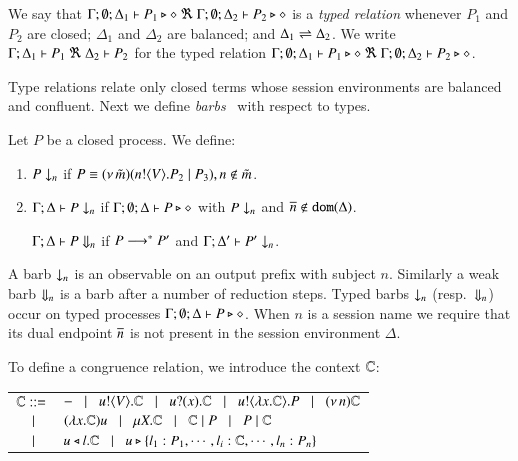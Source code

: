 \smallskip 

\begin{definition}\rm %
	We say that
	$\Gamma; \emptyset; \Delta_1 \vdash P_1 \triangleright \diamond\ \Re \ \Gamma; \emptyset; \Delta_2 \vdash P_2 \triangleright \diamond$
	is a {\em typed relation} whenever $P_1$ and $P_2$ are closed;
		$\Delta_1$ and $\Delta_2$ are balanced; and 
		$\Delta_1 \rightleftharpoons \Delta_2$.
We write
$\horel{\Gamma}{\Delta_1}{P_1}{\ \Re \ }{\Delta_2}{P_2}$
for the typed relation $\Gamma; \emptyset; \Delta_1 \vdash P_1 \triangleright \diamond\ \Re \ \Gamma; \emptyset; \Delta_2 \vdash P_2 \triangleright \diamond$.
\end{definition}

\smallskip 

\noi Type relations relate only closed terms whose
session environments %
are balanced  and confluent.
Next we define  {\em barbs}~\cite{MiSa92}
with respect to types. 

\smallskip 

\begin{definition}[Barbs]\rm
Let $P$ be a closed process. We define:
\begin{enumerate}
		\item	$P \downarrow_{n}$ if $P \equiv (\nu\, \tilde{m})(n ! \langle V \rangle . P_2 \;|\; P_3), n \notin \tilde{m}$. %

		\item	$\Gamma; \Delta \vdash P \downarrow_{n}$ if
			$\Gamma; \emptyset; \Delta \vdash P \triangleright \diamond$ with $P \downarrow_{n}$ and $\overline{n} \notin \mathtt{dom}(\Delta)$.

	$\Gamma; \Delta \vdash P \Downarrow_{n}$ if $P \longrightarrow^* P'$ and
			$\Gamma; \Delta' \vdash P' \downarrow_{n}$.			
	\end{enumerate}
\end{definition}

\smallskip 

\noi A barb $\downarrow_{n}$ is an observable on an output prefix with subject $n$.
Similarly a weak barb $\Downarrow_{n}$ is a barb after a number of reduction steps.
Typed barbs $\downarrow_{n}$ (resp.\ $\Downarrow_{n}$)
occur on typed processes $\Gamma; \emptyset; \Delta \vdash P \triangleright \diamond$.
When $n$ is a session name we require that its dual endpoint $\overline{n}$ is not present
in the session environment $\Delta$.

To define a congruence relation, we introduce the context ${\Bbb C}$:\\  

\noi 
\begin{tabular}{rl}
	${\Bbb C}::=$\!\!\!\! & $- \;\;\;|\;\;\; u ! \langle V \rangle . {\Bbb C} \;\;\;|\;\;\; u ? (x) . {\Bbb C}
\;\;\;|\;\;\; u ! \langle \lambda x.{\Bbb C} \rangle . P
\;\;\;|\;\;\; (\nu\, n) {\Bbb C}$\\
             $\;\;\;|\;\;\;$\!\!\!\!& $(\lambda x.{\Bbb C})u \;\;\;|\;\;\; \mu X. {\Bbb C} \;\;\;|\;\;\; {\Bbb C} \;|\; P \;\;\;|\;\;\; P \;|\; {\Bbb C}$\\ 
$\;\;\;|\;\;\;$\!\!\!\!& $u \triangleleft l . {\Bbb C} \;\;\;|\;\;\; u \triangleright \{l_1:P_1,\cdots,l_i:{\Bbb C},\cdots,l_n:P_n\}$\\
	\end{tabular}
\smallskip 

